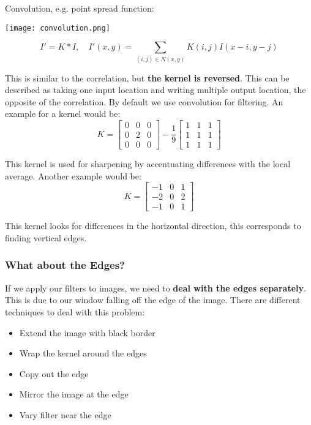 Convolution, e.g. point spread function:

\begin{center}
	\texttt{[image: convolution.png]}
\end{center}
$$I' = K * I, \quad I'(x,y) = \sum_{(i,j) \in N(x,y)} K(i, j) I(x - i, y - j)$$

This is similar to the correlation, but \textbf{the kernel is reversed}. This can be described as taking one input location and writing multiple output location, the opposite of the correlation. By default we use convolution for filtering. An example for a kernel would be:
$$ K = 
\begin{bmatrix}
    0 & 0 & 0\\
    0 & 2 & 0\\
    0 & 0 & 0
\end{bmatrix}
 -
\frac{1}{9}
\begin{bmatrix}
   1 & 1 & 1\\
   1 & 1 & 1\\
   1 & 1 & 1
\end{bmatrix}
$$

This kernel is used for sharpening by accentuating differences with the local average. Another example would be:
$$ K = 
\begin{bmatrix}
    -1 & 0 & 1\\
    -2 & 0 & 2\\
    -1 & 0 & 1
\end{bmatrix}
$$

This kernel looks for differences in the horizontal direction, this corresponds to finding vertical edges.

\subsubsection{What about the Edges?}

If we apply our filters to images, we need to \textbf{deal with the edges separately}. This is due to our window falling off the edge of the image. There are different techniques to deal with this problem:
\begin{itemize}
	\item Extend the image with black border
	\item Wrap the kernel around the edges
	\item Copy out the edge
	\item Mirror the image at the edge
	\item Vary filter near the edge
\end{itemize}

